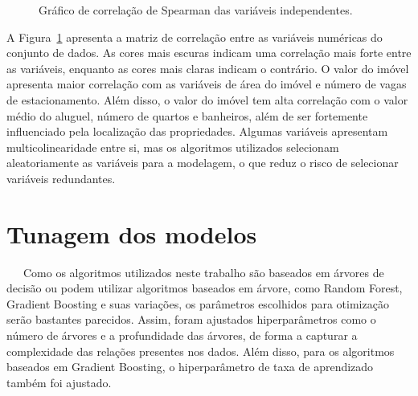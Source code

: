 \documentclass[
  12pt,
  a4paper,
]{scrreprt}
\begin{document}
\begin{figure}


\caption{\label{fig-corplot}Gráfico de correlação de Spearman das
variáveis independentes.}

\end{figure}%

\vspace{12pt}

A Figura~\ref{fig-corplot} apresenta a matriz de correlação entre as
variáveis numéricas do conjunto de dados. As cores mais escuras indicam
uma correlação mais forte entre as variáveis, enquanto as cores mais
claras indicam o contrário. O valor do imóvel apresenta maior correlação
com as variáveis de área do imóvel e número de vagas de estacionamento.
Além disso, o valor do imóvel tem alta correlação com o valor médio do
aluguel, número de quartos e banheiros, além de ser fortemente
influenciado pela localização das propriedades. Algumas variáveis
apresentam multicolinearidade entre si, mas os algoritmos utilizados
selecionam aleatoriamente as variáveis para a modelagem, o que reduz o
risco de selecionar variáveis redundantes.

\newpage{}

\section{Tunagem dos modelos}\label{tunagem-dos-modelos}

~~~Como os algoritmos utilizados neste trabalho são baseados em árvores
de decisão ou podem utilizar algoritmos baseados em árvore, como Random
Forest, Gradient Boosting e suas variações, os parâmetros escolhidos
para otimização serão bastantes parecidos. Assim, foram ajustados
hiperparâmetros como o número de árvores e a profundidade das árvores,
de forma a capturar a complexidade das relações presentes nos dados.
Além disso, para os algoritmos baseados em Gradient Boosting, o
hiperparâmetro de taxa de aprendizado também foi ajustado.
\end{document}
